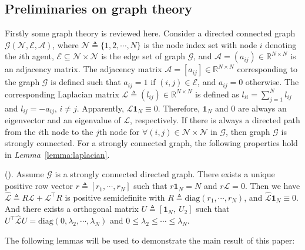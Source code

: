 \documentclass{ifacconf}
\begin{document}
\subsection{Preliminaries on graph theory}
\vspace*{-0.3 cm}
Firstly some graph theory is reviewed here.
Consider a directed connected graph $\mathcal{G}(\mathcal{N},\mathcal{E},\mathcal{A})$, where $\mathcal{N}\triangleq\{1,2,\cdots,N\}$ is the node index set with node $i$ denoting the $i$th agent,  $\mathcal{E}\subseteq\mathcal{N}\times\mathcal{N}$ is the edge set of graph $\mathcal{G}$,  and $\mathcal{A}=(a_{ij})\in\mathbb{R}^{N\times N}$ is an adjacency matrix. 
The adjacency matrix $\mathcal{A} = [a_{ij}] \in \mathbb{R}^{N \times N}$ corresponding to the graph $\mathcal{G}$ is defined such that $a_{ij} = 1$ if $(i,j) \in \mathcal{E}$,  and $a_{ij} = 0$ otherwise. 
The corresponding Laplacian matrix $\mathcal{L}\triangleq(l_{ij})\in\mathbb{R}^{N\times N}$ is defined as $l_{ii} = \sum^N_{j=1}l_{ij}$ and $l_{ij}=-a_{ij}$, $i\ne j$. 
Apparently, $\mathcal{L}\mathbf{1}_{N}\equiv0$.
Therefore, $\mathbf{1}_{N}$ and $0$ are always an eigenvector and an eigenvalue of $\mathcal{L}$, respectively. 
If there is always a directed path from the $i$th node to the $j$th node for $\forall(i,j)\in\mathcal{N}\times\mathcal{N}$ in $\mathcal{G}$, then graph $\mathcal{G}$ is strongly connected. 
For a strongly connected graph, the following properties hold in {\it Lemma}~\ref{lemma:laplacian}. 
\begin{lemma}(\cite{olfati2007consensus}).
 \label{lemma:laplacian}
     Assume $\mathcal{G}$ is a strongly connected directed graph. 
     There exists a unique positive row vector $r \triangleq [r_1,\cdots,r_ N ]$ such that $r\mathbf{1}_N = N $ and $r\mathcal{L}=0$. 
     Then we have $\hat{\mathcal{L}}\triangleq R\mathcal{L}+\mathcal{L}^\top R$ is positive semidefinite with $R\triangleq\mathrm{diag}(r_1,\cdots,r_N )$, and $\hat{\mathcal{L}}\mathbf{1}_N \equiv0$. 
     And there exists a orthogonal matrix $U\triangleq[\mathbf{1}_N,\ U_2]$ such that $U^\top\hat{\mathcal{L}}U=\mathrm{diag}(0,\lambda_2,\cdots,\lambda_N )$ and $0\le\lambda_2\le\cdots\le\lambda_N $.
 \end{lemma}

    \iffalse
            The following lemmas will be used to demonstrate the main result of this paper:
            
\end{document}
